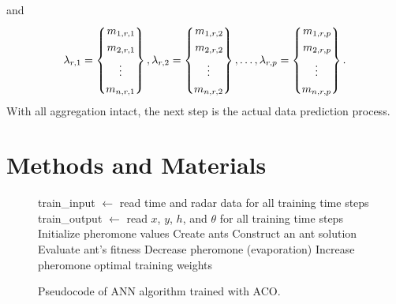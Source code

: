 \documentclass[12pt]{uthesis-v12}  %
\begin{document}
and
\begin{equation}
\lambda_{r,1} = \left\{
\begin{aligned}
m_{1,r,1} \\
m_{2,r,1} \\
\vdotswithin{m_{n,r,1}} \\
m_{n,r,1} 
\end{aligned}
\right\},
\lambda_{r,2} = \left\{
\begin{aligned}
m_{1,r,2} \\
m_{2,r,2} \\
\vdotswithin{m_{n,r,2}} \\
m_{n,r,2} 
\end{aligned}
\right\}, \dots,
\lambda_{r,p} = \left\{
\begin{aligned}
m_{1,r,p} \\
m_{2,r,p} \\
\vdotswithin{m_{n,r,p}} \\
m_{n,r,p}
\end{aligned}
\right\}.
\label{m5}
\end{equation}
With all aggregation intact, the next step is the actual data prediction process.

\section{Methods and Materials}

\begin{figure}
\begin{algorithmic}[1]
\STATE train\_input $\leftarrow$ read time and radar data for all training time steps
\STATE train\_output $\leftarrow$ read $x$, $y$, $h$, and $\theta$ for all training time steps
\STATE Initialize pheromone values 
\STATE Create ants 
		\STATE Construct an ant solution
		\STATE Evaluate ant's fitness
	\ENDFOR
		\STATE Decrease pheromone (evaporation)
	\ENDFOR
		\STATE Increase pheromone
	\ENDFOR
\ENDWHILE
\RETURN optimal training weights
\label{ann-alg1}
\end{algorithmic}
\caption{Pseudocode of ANN algorithm trained with ACO.} \label{ann-alg}
\end{figure}
\end{document}
